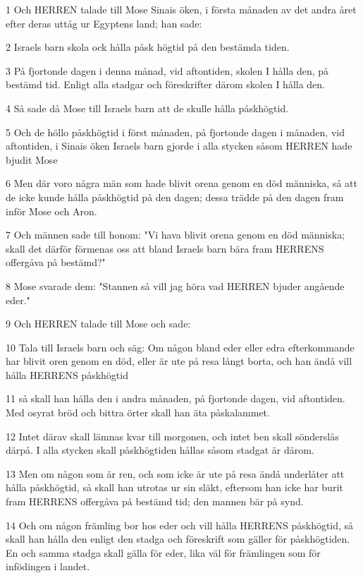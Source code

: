 \par 1 Och HERREN talade till Mose Sinais öken, i första månaden av det andra året efter deras uttåg ur Egyptens land; han sade:
\par 2 Israels barn skola ock hålla påsk högtid på den bestämda tiden.
\par 3 På fjortonde dagen i denna månad, vid aftontiden, skolen I hålla den, på bestämd tid. Enligt alla stadgar och föreskrifter därom skolen I hålla den.
\par 4 Så sade då Mose till Israels barn att de skulle hålla påskhögtid.
\par 5 Och de höllo påskhögtid i först månaden, på fjortonde dagen i månaden, vid aftontiden, i Sinais öken Israels barn gjorde i alla stycken såsom HERREN hade bjudit Mose
\par 6 Men där voro några män som hade blivit orena genom en död människa, så att de icke kunde hålla påskhögtid på den dagen; dessa trädde på den dagen fram inför Mose och Aron.
\par 7 Och männen sade till honom: "Vi hava blivit orena genom en död människa; skall det därför förmenas oss att bland Israels barn bära fram HERRENS offergåva på bestämd?"
\par 8 Mose svarade dem: "Stannen så vill jag höra vad HERREN bjuder angående eder."
\par 9 Och HERREN talade till Mose och sade:
\par 10 Tala till Israels barn och säg: Om någon bland eder eller edra efterkommande har blivit oren genom en död, eller är ute på resa långt borta, och han ändå vill hålla HERRENS påskhögtid
\par 11 så skall han hålla den i andra månaden, på fjortonde dagen, vid aftontiden. Med osyrat bröd och bittra örter skall han äta påskalammet.
\par 12 Intet därav skall lämnas kvar till morgonen, och intet ben skall sönderslås därpå. I alla stycken skall påskhögtiden hållas såsom stadgat är därom.
\par 13 Men om någon som är ren, och som icke är ute på resa ändå underlåter att hålla påskhögtid, så skall han utrotas ur sin släkt, eftersom han icke har burit fram HERRENS offergåva på bestämd tid; den mannen bär på synd.
\par 14 Och om någon främling bor hos eder och vill hålla HERRENS påskhögtid, så skall han hålla den enligt den stadga och föreskrift som gäller för påskhögtiden. En och samma stadga skall gälla för eder, lika väl för främlingen som för infödingen i landet.
